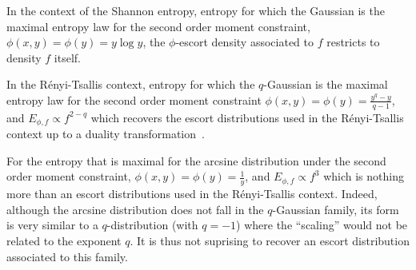 \documentclass[entropy,article,submit,moreauthors,pdftex]{Definitions/mdpi}
\newcounter{GaussExample}%
\newcounter{qGaussExample}%
\newcounter{arcsineExample}%
\newcommand{\SZ}[1]{{\color{blue} #1}}                                       %
\begin{document}
\renewcommand{\theexample}{\arabic{example}}
\begin{Example}
  In the context of  the Shannon entropy, entropy for which  the Gaussian is the
  maximal  entropy law  for the  second  order moment  constraint, $\phi(x,y)  =
  \phi(y) = y \log y$, the  $\phi$-escort density associated to $f$ restricts to
  density $f$ itself.
\end{Example}
%
\begin{Example}
  In  the R\'enyi-Tsallis  context, entropy  for which  the $q$-Gaussian  is the
  maximal  entropy law  for  the  second order  moment  constraint $\phi(x,y)  =
  \phi(y) = \frac{y^q-y}{q-1}$, and  $E_{\phi,f} \propto f^{2-q}$ which recovers
  the escort distributions  used in the R\'enyi-Tsallis context up  to a duality
  transformation~\cite{Nau11}.
\end{Example}
%
\begin{Example}
  For the entropy that is maximal  for the arcsine distribution under the second
  order moment constraint, $\phi(x,y) =  \phi(y) = \frac{1}{y}$, and $E_{\phi,f}
  \propto f^3$  which is nothing more  than an escort distributions  used in the
  R\'enyi-Tsallis context.   Indeed, although the arcsine  distribution does not
  fall  in   the  $q$-Gaussian   family,  its   form  is   very  similar   to  a
  $q$-distribution  \SZ{(with $q  = -1$)}  where  the ``scaling''  would not  be
  related to the  exponent $q$.  It is  thus not suprising to  recover an escort
  distribution associated to this family.
\end{Example}
\end{document}

